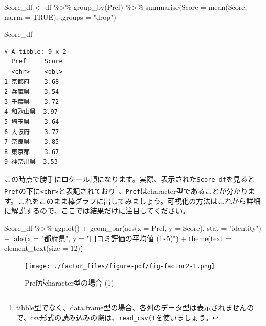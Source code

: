 \documentclass[
  a4paper,
  pandoc,
  ja=standard,
  jafont=haranoaji]{bxjsbook}
\newenvironment{Shaded}{\begin{snugshade}}{\end{snugshade}}
\newcommand{\AttributeTok}[1]{\textcolor[rgb]{0.00,0.48,0.65}{#1}}
\newcommand{\ConstantTok}[1]{\textcolor[rgb]{0.56,0.35,0.01}{#1}}
\newcommand{\DecValTok}[1]{\textcolor[rgb]{0.68,0.00,0.00}{#1}}
\newcommand{\FunctionTok}[1]{\textcolor[rgb]{0.28,0.35,0.67}{#1}}
\newcommand{\NormalTok}[1]{\textcolor[rgb]{0.00,0.48,0.65}{#1}}
\newcommand{\OtherTok}[1]{\textcolor[rgb]{0.00,0.48,0.65}{#1}}
\newcommand{\SpecialCharTok}[1]{\textcolor[rgb]{0.37,0.37,0.37}{#1}}
\newcommand{\StringTok}[1]{\textcolor[rgb]{0.13,0.47,0.30}{#1}}
\begin{document}
\begin{Shaded}
\begin{Highlighting}[numbers=left,,]
\NormalTok{Score\_df }\OtherTok{\textless{}{-}}\NormalTok{ df }\SpecialCharTok{\%\textgreater{}\%}
    \FunctionTok{group\_by}\NormalTok{(Pref) }\SpecialCharTok{\%\textgreater{}\%}
    \FunctionTok{summarise}\NormalTok{(}\AttributeTok{Score   =} \FunctionTok{mean}\NormalTok{(Score, }\AttributeTok{na.rm =} \ConstantTok{TRUE}\NormalTok{),}
              \AttributeTok{.groups =} \StringTok{"drop"}\NormalTok{)}

\NormalTok{Score\_df}
\end{Highlighting}
\end{Shaded}

\begin{verbatim}
# A tibble: 9 x 2
  Pref     Score
  <chr>    <dbl>
1 京都府    3.68
2 兵庫県    3.54
3 千葉県    3.72
4 和歌山県  3.97
5 埼玉県    3.64
6 大阪府    3.77
7 奈良県    3.85
8 東京都    3.67
9 神奈川県  3.53
\end{verbatim}

この時点で勝手にロケール順になります。実際、表示された\texttt{Score\_df}を見ると\texttt{Pref}の下に\texttt{\textless{}chr\textgreater{}}と表記されており\footnote{tibble型でなく、data.frame型の場合、各列のデータ型は表示されませんので、csv形式の読み込みの際は、\texttt{read\_csv()}を使いましょう。}、\texttt{Pref}はcharacter型であることが分かります。これをこのまま棒グラフに出してみましょう。可視化の方法はこれから詳細に解説するので、ここでは結果だけに注目してください。

\begin{Shaded}
\begin{Highlighting}[numbers=left,,]
\NormalTok{Score\_df }\SpecialCharTok{\%\textgreater{}\%}
  \FunctionTok{ggplot}\NormalTok{() }\SpecialCharTok{+}
  \FunctionTok{geom\_bar}\NormalTok{(}\FunctionTok{aes}\NormalTok{(}\AttributeTok{x =}\NormalTok{ Pref, }\AttributeTok{y =}\NormalTok{ Score), }\AttributeTok{stat =} \StringTok{"identity"}\NormalTok{) }\SpecialCharTok{+}
  \FunctionTok{labs}\NormalTok{(}\AttributeTok{x =} \StringTok{"都府県"}\NormalTok{, }\AttributeTok{y =} \StringTok{"口コミ評価の平均値 (1\textasciitilde{}5)"}\NormalTok{) }\SpecialCharTok{+}
  \FunctionTok{theme}\NormalTok{(}\AttributeTok{text =} \FunctionTok{element\_text}\NormalTok{(}\AttributeTok{size =} \DecValTok{12}\NormalTok{))}
\end{Highlighting}
\end{Shaded}

\begin{figure}[H]

{\centering \texttt{[image: ./factor\_files/figure-pdf/fig-factor2-1.png]}

}

\caption{\label{fig-factor2}Prefがcharacter型の場合 (1)}

\end{figure}
\end{document}
